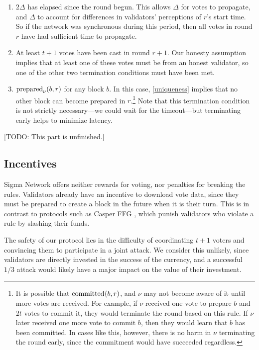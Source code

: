 \begin{enumerate}
  \item $2 \Delta$ has elapsed since the round begun. This allows $\Delta$ for votes to propagate, and $\Delta$ to account for differences in validators' perceptions of $r$'s start time. So if the network was synchronous during this period, then all votes in round $r$ have had sufficient time to propagate.
  \item At least $t + 1$ votes have been cast in round $r + 1$. Our honesty assumption implies that at least one of these votes must be from an honest validator, so one of the other two termination conditions must have been met.
  \item $\prepared[\nu]{b, r}$ for any block $b$. In this case, \autoref{uniqueness} implies that no other block can become prepared in $r$.\footnote{It is possible that $\committed{b, r}$, and $\nu$ may not become aware of it until more votes are received. For example, if $\nu$ received one vote to prepare $b$ and $2t$ votes to commit it, they would terminate the round based on this rule. If $\nu$ later received one more vote to commit $b$, then they would learn that $b$ has been committed. In cases like this, however, there is no harm in $\nu$ terminating the round early, since the commitment would have succeeded regardless.} Note that this termination condition is not strictly necessary---we could wait for the timeout---but terminating early helps to minimize latency.
\end{enumerate}

[TODO: This part is unfinished.]


\subsection{Incentives}

Sigma Network offers neither rewards for voting, nor penalties for breaking the rules. Validators already have an incentive to download vote data, since they must be prepared to create a block in the future when it is their turn. This is in contrast to protocols such as Casper FFG \cite{buterin2017casper}, which punish validators who violate a rule by slashing their funds.

The safety of our protocol lies in the difficulty of coordinating $t + 1$ voters and convincing them to participate in a joint attack. We consider this unlikely, since validators are directly invested in the success of the currency, and a successful $1/3$ attack would likely have a major impact on the value of their investment.

